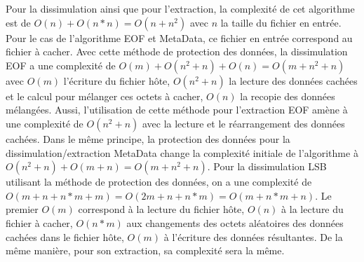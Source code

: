 \documentclass[11pt]{article}
\begin{document}
\begin{minipage}{.6\textwidth}
Pour la dissimulation ainsi que pour l'extraction, la complexité de cet 
algorithme est de $O(n)+O(n*n)=O(n+n^2)$ avec $n$ la taille
du fichier en entrée. \newline 
Pour le cas de l'algorithme EOF et MetaData, ce fichier en entrée correspond 
au fichier à cacher. \newline
Avec cette méthode de protection des données, la dissimulation EOF a une 
complexité de $O(m)+O(n^2+n)+O(n)=O(m+n^2+n)$ avec $O(m)$ l'écriture du 
fichier hôte, $O(n^2+n)$ la lecture des données cachées et le calcul pour 
mélanger ces octets à cacher, $O(n)$ la recopie des données mélangées. 
\newline
Aussi, l'utilisation de cette méthode pour l'extraction EOF amène à une 
complexité de $O(n^2+n)$ avec la lecture et le réarrangement 
des données cachées. 
\newline \newline
Dans le même principe, la protection des données pour la dissimulation/extraction 
MetaData change la complexité initiale de l'algorithme à $O(n^2+n)+O(m+n)=O(m+n^2+n)$. 
\newline \newline
Pour la dissimulation LSB utilisant la méthode de protection 
des données, on a une complexité de $O(m+n+n*m+m)=O(2m+n+n*m)=O(m+n*m+n)$. Le premier $O(m)$ 
correspond à la lecture du fichier hôte, $O(n)$ à la lecture du fichier à cacher, 
$O(n*m)$ aux changements des octets aléatoires des données cachées dans le fichier hôte, 
$O(m)$ à l'écriture des données résultantes. \newline
De la même manière, pour son extraction, sa complexité sera la même. 
\end{minipage}
\begin{minipage}{.3\textwidth}
 
\end{minipage}
\end{document}

